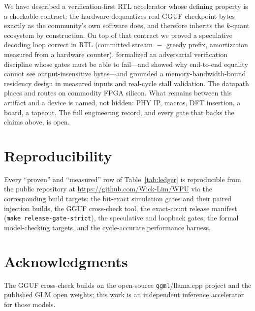 \documentclass[11pt]{article}
\newcommand{\code}[1]{\texttt{#1}}
\begin{document}
We have described a verification-first RTL accelerator whose defining property
is a checkable contract: the hardware dequantizes real GGUF checkpoint bytes
exactly as the community's own software does, and therefore inherits the
$k$-quant ecosystem by construction. On top of that contract we proved a
speculative decoding loop correct in RTL (committed stream $\equiv$ greedy
prefix, amortization measured from a hardware counter), formalized an
adversarial verification discipline whose gates must be able to fail---and
showed why end-to-end equality cannot see output-insensitive bytes---and
grounded a memory-bandwidth-bound residency design in measured inputs and
real-cycle stall validation. The datapath places and routes on commodity FPGA
silicon. What remains between this artifact and a device is named, not hidden:
PHY IP, macros, DFT insertion, a board, a tapeout. The full engineering record,
and every gate that backs the claims above, is open.

\section*{Reproducibility}
Every ``proven'' and ``measured'' row of Table~\ref{tab:ledger} is reproducible
from the public repository at \url{https://github.com/Wick-Lim/WPU} via the
corresponding build targets: the bit-exact simulation gates and their paired
injection builds, the GGUF cross-check tool, the exact-count release manifest
(\code{make release-gate-strict}), the speculative and loopback gates, the
formal model-checking targets, and the cycle-accurate performance harness.

\section*{Acknowledgments}
The GGUF cross-check builds on the open-source \code{ggml}/llama.cpp project
and the published GLM open weights; this work is an independent inference
accelerator for those models.
\end{document}
